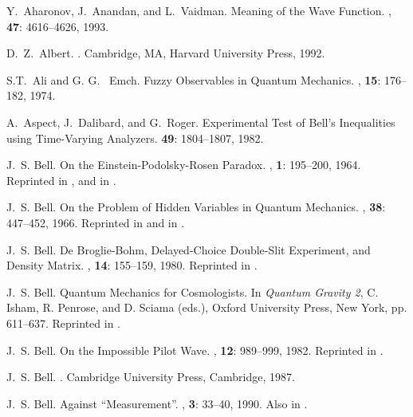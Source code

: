 \documentclass[12pt]{article}
\begin{document}
\begin{thebibliography}{10}

 Y.~Aharonov, J.~Anandan, and L.~Vaidman.  \newblock
   Meaning of the {W}ave {F}unction.  , {\bf 47}: 4616--4626, 1993.

 D.~Z.~Albert. .  \newblock Cambridge, MA, Harvard University Press,
   1992.

 S.T.~Ali and G. G.~ Emch. \newblock Fuzzy Observables
   in Quantum Mechanics. , {\bf 15}: 176--182, 1974.

 A.~Aspect, J.~Dalibard, and G.~Roger.  \newblock
   Experimental Test of Bell's Inequalities using Time-Varying
   Analyzers.   {\bf 49}: 1804--1807,
   1982.

 J.~S. Bell.  \newblock On the
   {E}instein-{P}odolsky-{R}osen {P}aradox.  ,
   {\bf 1}: 195--200, 1964.  \newblock Reprinted in \cite{WZ83}, and in
   \cite{Bel87}.

 J.~S. Bell.  \newblock On the {P}roblem of {H}idden
   {V}ariables in {Q}uantum {M}echanics.  , {\bf 38}: 447--452, 1966.  \newblock Reprinted in
   \cite{WZ83} and in \cite{Bel87}.

 J.~S. Bell.  \newblock De {B}roglie-{B}ohm,
   {D}elayed-{C}hoice {D}ouble-{S}lit {E}xperiment, and {D}ensity
   {M}atrix.  , {\bf 14}: 155--159, 1980.  \newblock
   Reprinted in \cite{Bel87}.

 J.~S. Bell.  \newblock Quantum Mechanics for
   Cosmologists.  In {\it Quantum Gravity 2}, C. Isham, R. Penrose, and
   D.  Sciama (eds.), Oxford University Press, New York, pp. 611--637.
   Reprinted in \cite{Bel87}.

 J.~S. Bell.  \newblock On the {I}mpossible {P}ilot
   {W}ave.  , {\bf 12}: 989--999,
   1982.  \newblock Reprinted in \cite{Bel87}.

 J.~S. Bell.  .  \newblock Cambridge University Press,
   Cambridge, 1987.

 J.~S. Bell. \newblock Against ``Measurement''.
   , {\bf 3}: 33--40, 1990.  \newblock
   Also in \cite{Mil90}.


\end{thebibliography}
\end{document}
